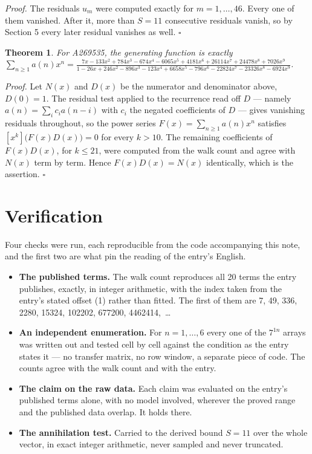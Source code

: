 \documentclass[11pt]{article}
\newtheorem{theorem}{Theorem}
\theoremstyle{definition}
\begin{document}
{\itshape Proof.} The residuals $u_m$ were computed exactly for $m = 1,\dots,46$. Every one of them vanished. After it, more than $S = 11$ consecutive residuals vanish, so by Section 5 every later residual vanishes as well. $\square$

\begin{theorem} For A269535, the generating function is exactly $\sum_{n\ge 1} a(n)x^n = \frac{7x - 133x^{2} + 784x^{3} - 674x^{4} - 6065x^{5} + 4181x^{6} + 26114x^{7} + 24478x^{8} + 7026x^{9}}{1 - 26x + 246x^{2} - 896x^{3} - 123x^{4} + 6658x^{5} - 796x^{6} - 22824x^{7} - 23326x^{8} - 6924x^{9}}$.\end{theorem}

{\itshape Proof.} Let $N(x)$ and $D(x)$ be the numerator and denominator above, $D(0)=1$. The residual test applied to the recurrence read off $D$ --- namely $a(n) = \sum_i c_i a(n-i)$ with $c_i$ the negated coefficients of $D$ --- gives vanishing residuals throughout, so the power series $F(x)=\sum_{n\ge 1}a(n)x^n$ satisfies $[x^k]\bigl(F(x)D(x)\bigr) = 0$ for every $k > 10$. The remaining coefficients of $F(x)D(x)$, for $k \le 21$, were computed from the walk count and agree with $N(x)$ term by term. Hence $F(x)D(x) = N(x)$ identically, which is the assertion. $\square$

\section{Verification}

Four checks were run, each reproducible from the code accompanying this note, and the first two are what pin the reading of the entry's English.

\begin{itemize}

\item {\bfseries The published terms.} The walk count reproduces all 20 terms the entry publishes, exactly, in integer arithmetic, with the index taken from the entry's stated offset (1) rather than fitted. The first of them are 7, 49, 336, 2280, 15324, 102202, 677200, 4462414,~\dots

\item {\bfseries An independent enumeration.} For $n = 1,\dots,6$ every one of the $7^{1n}$ arrays was written out and tested cell by cell against the condition as the entry states it --- no transfer matrix, no row window, a separate piece of code. The counts agree with the walk count and with the entry.

\item {\bfseries The claim on the raw data.} Each claim was evaluated on the entry's published terms alone, with no model involved, wherever the proved range and the published data overlap. It holds there.

\item {\bfseries The annihilation test.} Carried to the derived bound $S = 11$ over the whole vector, in exact integer arithmetic, never sampled and never truncated.

\end{itemize}
\end{document}
